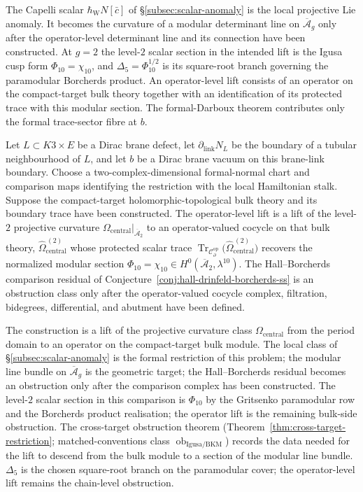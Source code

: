 The Capelli scalar \(\hbar_{\mathrm{W}}N[\bar c]\) of
\S\ref{subsec:scalar-anomaly} is the local projective Lie anomaly.
It becomes the curvature of a modular determinant line on
$\overline{\mathcal A}_g$ only after the operator-level determinant
line and its connection have been constructed.  At
$g=2$ the level-$2$ scalar section in the intended lift is the
Igusa cusp form $\Phi_{10}=\chi_{10}$, and
$\Delta_5=\Phi_{10}^{1/2}$ is its square-root branch governing the
paramodular Borcherds product.  An operator-level lift consists of
an operator on the compact-target bulk theory together with an identification of
its protected trace with this modular section.  The formal-Darboux
theorem contributes only the formal trace-sector fibre at \(b\).

\begin{conj}\label{conj:operator-modular-lift}
  Let \(L\subset K3\times E\) be a Dirac brane defect, let
  \(\partial_{\mathrm{link}}N_L\) be the boundary of a tubular
  neighbourhood of \(L\), and let \(b\) be a Dirac brane vacuum on this
  brane-link boundary.  Choose a two-complex-dimensional formal-normal
  chart and comparison maps identifying the restriction with the local
  Hamiltonian stalk.  Suppose the compact-target
  holomorphic-topological bulk theory and its boundary trace have
  been constructed.  The operator-level lift is a lift of the
  level-$2$ projective curvature
  $\Omega_{\mathrm{central}}\bigl|_{\overline{\mathcal A}_2}$ to an
  operator-valued cocycle on that bulk theory,
  $\widehat\Omega_{\mathrm{central}}^{\,(2)}$ whose protected
  scalar trace
  $\operatorname{Tr}_{\mathcal C^{\mathrm{op}}_\partial}\bigl(\widehat\Omega_{\mathrm{central}}^{\,(2)}\bigr)$
  recovers the normalized modular section
  \(\Phi_{10}=\chi_{10}\in H^0(\overline{\mathcal A}_2,\lambda^{10})\).  The
  Hall--Borcherds comparison residual of
  Conjecture~\ref{conj:hall-drinfeld-borcherds-ss} is an obstruction class
  only after the operator-valued cocycle complex, filtration, bidegrees,
  differential, and abutment have been defined.
\end{conj}

The construction is a lift of the projective curvature
class $\Omega_{\mathrm{central}}$ from the period domain to an
operator on the compact-target bulk module.  The local class of
\S\ref{subsec:scalar-anomaly} is the formal restriction of this
problem; the modular line bundle on \(\overline{\mathcal A}_g\) is the
geometric target; the Hall--Borcherds residual becomes an obstruction
only after the comparison complex has been constructed.  The
level-$2$ scalar section in this comparison is \(\Phi_{10}\) by the
Gritsenko paramodular row and the Borcherds product realisation; the operator
lift is the remaining bulk-side obstruction.  The
cross-target obstruction theorem
(Theorem~\ref{thm:cross-target-restriction}; matched-conventions
class $\operatorname{ob}_{\mathrm{Igusa/BKM}}$) records the data
needed for the lift to descend from the bulk
module to a section of the modular line bundle.  $\Delta_5$ is the
chosen square-root branch on the paramodular cover; the
operator-level lift remains the chain-level obstruction.

